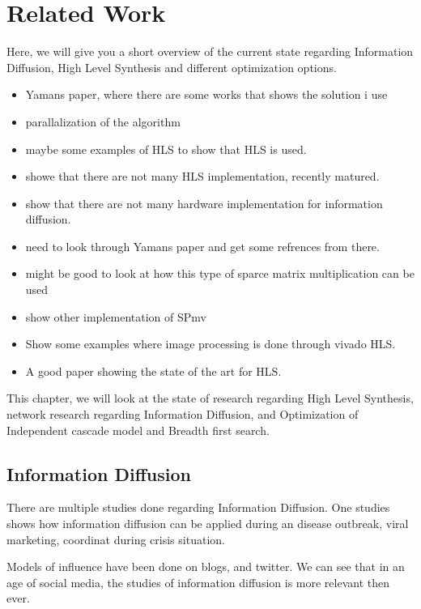 \chapter{Related Work}  \label{relatedWork}


Here, we will give you a short overview of the current state regarding Information Diffusion, High Level Synthesis and different optimization options.

\begin{itemize}
  
\item Yamans paper, where there are some works that shows the solution i use
\item parallalization of the algorithm
\item maybe some examples of HLS to show that HLS is used.
\item showe that there are not many HLS implementation, recently matured. 
\item show that there are not many hardware implementation for information diffusion.
\item need to look through Yamans paper and get some refrences from there.
\item might be good to look at how this type of sparce matrix multiplication can be used
\item show other implementation of SPmv
\item Show some examples where image processing is done through vivado HLS.
\item \cite{HLSTutorial} A good paper showing the state of the art for HLS.

\end{itemize}

This chapter, we will look at the state of research regarding High Level Synthesis, network research regarding Information Diffusion, and Optimization of Independent cascade model and Breadth first search.

\section{Information Diffusion} 
There are multiple studies done regarding Information Diffusion. One studies shows how information diffusion can be applied during an disease outbreak\cite{InformationDiffusionThroughBlogspace}, viral marketing\cite{ViralMarketing}, coordinat during crisis situation\cite{Starbird:2012:RRI:2145204.2145212}. 

Models of influence have been done on blogs\citep{Adar:2005:TIE:1092358.1092473}\cite{GomezRodriguez:2010:IND:1835804.1835933}, and twitter\cite{Bakshy:2011:EIQ:1935826.1935845}. We can see that in an age of social media, the studies of information diffusion is more relevant then ever. 


